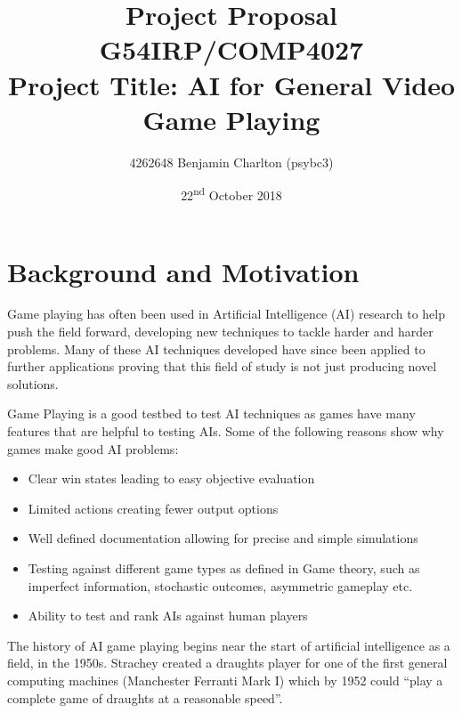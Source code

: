 \documentclass[a4paper]{article}
\begin{document}
\title{
    \vspace{-4ex}
    \LARGE{Project Proposal}
    \\ \large{G54IRP/COMP4027}
    \\ \large{Project Title: AI for General Video Game Playing}\vspace{-3ex}}
\author{4262648 Benjamin Charlton (psybc3)}
\date{\vspace{-2ex}22\textsuperscript{nd} October 2018}
\maketitle
\vspace{-7ex}

\section{Background and Motivation}
Game playing has often been used in Artificial Intelligence (AI) research to help push the field forward, developing new techniques to tackle harder and harder problems.
Many of these AI techniques developed have since been applied to further applications proving that this field of study is not just producing novel solutions.
\par
Game Playing is a good testbed to test AI techniques as games have many features that are helpful to testing AIs.
Some of the following reasons show why games make good AI problems:
\begin{itemize}[noitemsep,nolistsep]
    \item Clear win states leading to easy objective evaluation
    \item Limited actions creating fewer output options
    \item Well defined documentation allowing for precise and simple simulations
    \item Testing against different game types as defined in Game theory, such as imperfect information, stochastic outcomes, asymmetric gameplay etc.
    \item Ability to test and rank AIs against human players
\end{itemize}
\par
The history of AI game playing begins near the start of artificial intelligence as a field, in the 1950s.
Strachey created a draughts player for one of the first general computing machines (Manchester Ferranti Mark I) which by  1952 could ``play a complete game of draughts at a reasonable speed''\cite{BreifHistoryComputing}.
\end{document}
